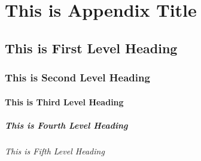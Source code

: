 \appendix
\chapter{This is Appendix Title}

\section{This is First Level Heading}
\lipsum[1-2]

\subsection{This is Second Level Heading}
\lipsum[3]

\subsubsection{This is Third Level Heading}
\lipsum[4]

\paragraph{This is Fourth Level Heading}
\lipsum[5]

\subparagraph{This is Fifth Level Heading}
\lipsum[6]



